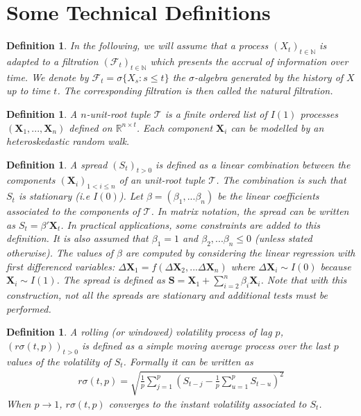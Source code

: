 \documentclass[11pt,a4,twosided,singlespacing,titlepagenumber=on]{scrreprt}
\numberwithin{equation}{chapter} %
\newtheorem{definition}[theorem]{Definition}%
\theoremstyle{remark}
\newcommand{\matr}[1]{\mathbf{#1}}
\begin{document}
\section{Some Technical Definitions}

\begin{definition}
In the following, we will assume that a process $(X_t)_{t \in \mathbb{N}}$ is adapted to a filtration $(\mathcal{F}_t)_{t \in \mathbb{N}}$ which presents the accrual of information over time. We denote by $\mathcal{F}_t = \sigma \{X_s : s \leq t \}$ the $\sigma$-algebra generated by the history of $X$ up to time $t$. The corresponding filtration is then called the natural filtration.
\end{definition}

\begin{definition}
A $n$-unit-root tuple $\mathcal{T}$ is a finite ordered list of $I(1)$ processes $(\matr{X}_1, ..., \matr{X}_n)$ defined on $\mathbb{R}^{n \times t}$. Each component $\matr{X}_i$ can be modelled by an heteroskedastic random walk. \label{definition_tuple}
\end{definition}

\begin{definition}
\label{spread_def}
A spread $(S_t)_{t>0}$ is defined as a linear combination between the components $(\matr{X}_i)_{1 < i \leq n}$ of an unit-root tuple $\mathcal{T}$. The combination is such that $S_t$ is stationary (i.e $I(0)$). Let $\beta = (\beta_1,...\beta_n)$ be the linear coefficients associated to the components of $\mathcal{T}$. In matrix notation, the spread can be written as $S_t = \beta' \matr{X}_t$. In practical applications, some constraints are added to this definition. It is also assumed that $\beta_1 = 1$ and $\beta_2,...\beta_n \leq 0$ (unless stated otherwise). The values of $\beta$ are computed by considering the linear regression with first differenced variables: $\Delta \matr{X}_1 = f(\Delta \matr{X}_2,...\Delta \matr{X}_n)$ where $\Delta \matr{X}_i \sim I(0)$ because $\matr{X}_i \sim I(1)$. The spread is defined as $\matr{S} = \matr{X}_1 + \sum_{i=2}^n \beta_i \matr{X}_i$. Note that with this construction, not all the spreads are stationary and additional tests must be performed.
\end{definition}

\begin{definition}
A rolling (or windowed) volatility process of lag $p$, $(r\sigma(t,p))_{t>0}$ is defined as a simple moving average process over the last $p$ values of the volatility of $S_t$. Formally it can be written as
\begin{align*}
r\sigma(t,p) = \sqrt{\frac{1}{p} \sum_{j=1}^p \left(S_{t-j} - \frac{1}{p}\sum_{u=1}^p S_{t-u} \right)^2}
\end{align*}
When $p \rightarrow 1$, $r\sigma(t,p)$ converges to the instant volatility associated to $S_t$. \label{windowed_volatility}
\end{definition}
\end{document}
